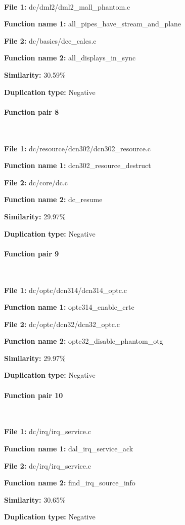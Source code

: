 \

\textbf{File 1:} dc/dml2/dml2\_mall\_phantom.c

\textbf{Function name 1:} all\_pipes\_have\_stream\_and\_plane

\textbf{File 2:} dc/basics/dce\_calcs.c

\textbf{Function name 2:} all\_displays\_in\_sync

\textbf{Similarity:} 30.59\%

\textbf{Duplication type:} Negative


\paragraph{Function pair 8 }  

\

\textbf{File 1:} dc/resource/dcn302/dcn302\_resource.c

\textbf{Function name 1:} dcn302\_resource\_destruct

\textbf{File 2:} dc/core/dc.c

\textbf{Function name 2:} dc\_resume

\textbf{Similarity:} 29.97\%

\textbf{Duplication type:} Negative


\paragraph{Function pair 9 }  

\

\textbf{File 1:} dc/optc/dcn314/dcn314\_optc.c

\textbf{Function name 1:} optc314\_enable\_crtc

\textbf{File 2:} dc/optc/dcn32/dcn32\_optc.c

\textbf{Function name 2:} optc32\_disable\_phantom\_otg

\textbf{Similarity:} 29.97\%

\textbf{Duplication type:} Negative


\paragraph{Function pair 10 }  

\

\textbf{File 1:} dc/irq/irq\_service.c

\textbf{Function name 1:} dal\_irq\_service\_ack

\textbf{File 2:} dc/irq/irq\_service.c

\textbf{Function name 2:} find\_irq\_source\_info

\textbf{Similarity:} 30.65\%

\textbf{Duplication type:} Negative



